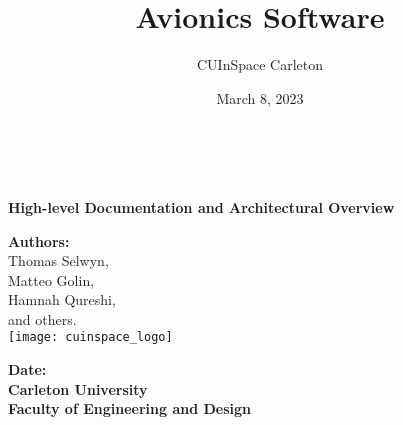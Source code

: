 \title{Avionics Software}
\author{CUInSpace Carleton}
\date{March 8, 2023}

\makeatletter
    \begin{titlepage}
        \begin{center}

            {\fontsize{34}{50}\selectfont \bf \@title}\\ 
            \vspace{5cm}

            {\bf\Large High-level Documentation and Architectural Overview}\\
            \vspace{3cm}

            {\large \textbf{Authors:}}\\
            {\large Thomas Selwyn,}\\
            {\large Matteo Golin,}\\
            {\large Hamnah Qureshi,}\\
            {\large and others.}\\
            \texttt{[image: cuinspace\_logo]}
            \vspace{1cm}
            
            {\large \textbf{Date:} \@date}\\
            {\large \textbf{Carleton University}}\\
            {\large \textbf{Faculty of Engineering and Design}}\\
        \end{center}
    \end{titlepage}
\makeatother